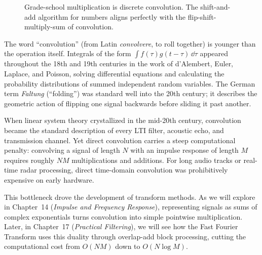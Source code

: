 \begin{figure}[H]
\centering
{}
\caption{Grade-school multiplication is discrete convolution. The shift-and-add algorithm for numbers aligns perfectly with the flip-shift-multiply-sum of convolution.}
\label{ch13:fig-poly-mult}
\end{figure}

\begin{historybox}
The word ``convolution'' (from Latin \emph{convolvere}, to roll together) is
younger than the operation itself. Integrals of the form $\int f(\tau)g(t-\tau)\,\dd\tau$
appeared throughout the 18th and 19th centuries in the work of d'Alembert, Euler,
Laplace, and Poisson, solving differential equations and calculating the probability
distributions of summed independent random variables. The German term \emph{Faltung}
(``folding'') was standard well into the 20th century; it describes the
geometric action of flipping one signal backwards before sliding it past another.

When linear system theory crystallized in the mid-20th century, convolution became
the standard description of every LTI filter, acoustic echo, and transmission channel.
Yet direct convolution carries a steep computational penalty: convolving a signal of
length $N$ with an impulse response of length $M$ requires roughly $NM$ multiplications
and additions. For long audio tracks or real-time radar processing, direct time-domain
convolution was prohibitively expensive on early hardware.

This bottleneck drove the development of transform methods. As we will explore in
Chapter~14 (\emph{Impulse and Frequency Response}), representing signals as sums of
complex exponentials turns convolution into simple pointwise multiplication. Later,
in Chapter~17 (\emph{Practical Filtering}), we will see how the Fast Fourier Transform
uses this duality through overlap-add block processing, cutting the computational
cost from $O(NM)$ down to $O(N \log M)$.
\end{historybox}


